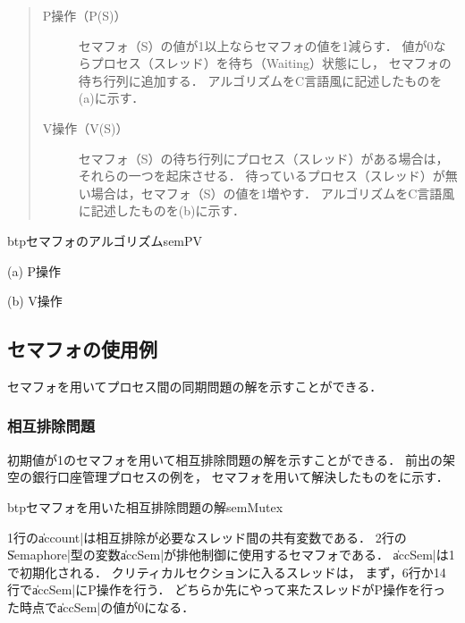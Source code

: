 \begin{quote}
\begin{description}
\item[P操作（P(S)）] %
セマフォ（S）の値が1以上ならセマフォの値を1減らす．
値が0ならプロセス（スレッド）を待ち（Waiting）状態にし，
セマフォの待ち行列に追加する．
アルゴリズムをC言語風に記述したものを(a)に示す．
\item[V操作（V(S)）] %
セマフォ（S）の待ち行列にプロセス（スレッド）がある場合は，
それらの一つを起床させる．
待っているプロセス（スレッド）が無い場合は，セマフォ（S）の値を1増やす．
アルゴリズムをC言語風に記述したものを(b)に示す．
\end{description}
\end{quote}

\begin{myfig}{btp}{セマフォのアルゴリズム}{semPV}
\small\begin{center}
\begin{minipage}{0.48\columnwidth}

\centerline{(a) P操作}
\end{minipage}\hspace{1em}
\begin{minipage}{0.48\columnwidth}

\centerline{(b) V操作}
\end{minipage}
\end{center}
\end{myfig}

\subsection{セマフォの使用例}
セマフォを用いてプロセス間の同期問題の解を示すことができる．

\subsubsection{相互排除問題}
初期値が1のセマフォを用いて相互排除問題の解を示すことができる．
前出の架空の銀行口座管理プロセスの例を，
セマフォを用いて解決したものをに示す．

\begin{myfig}{btp}{セマフォを用いた相互排除問題の解}{semMutex}

\end{myfig}

1行の\|account|は相互排除が必要なスレッド間の共有変数である．
2行の\|Semaphore|型の変数\|accSem|が排他制御に使用するセマフォである．
\|accSem|は1で初期化される．
クリティカルセクションに入るスレッドは，
まず，6行か14行で\|accSem|にP操作を行う．
どちらか先にやって来たスレッドがP操作を行った時点で\|accSem|の値が0になる．

